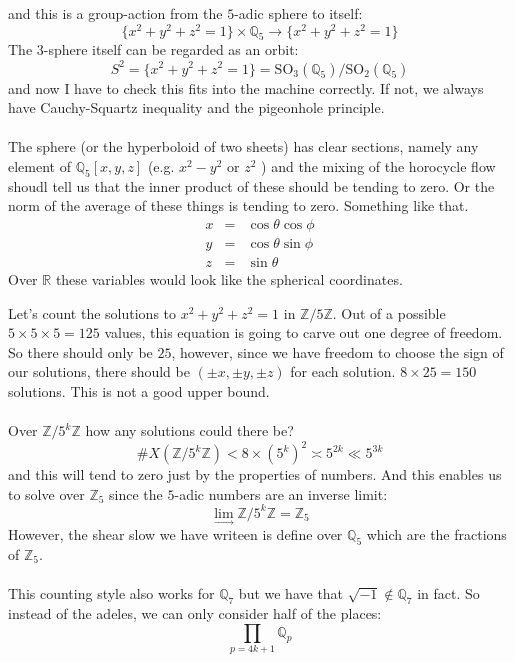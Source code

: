 \documentclass[12pt]{article}
\begin{document}
and this is a group-action from the $5$-adic sphere to itself:
$$\{ x^2 + y^2 + z^2 = 1 \} \times \mathbb{Q}_5 \to \{ x^2 + y^2 + z^2 = 1 \} $$
The 3-sphere itself can be regarded as an orbit:
$$ S^2 = \{ x^2 + y^2 + z^2 = 1 \} = \text{SO}_3(\mathbb{Q}_5) / \text{SO}_2(\mathbb{Q}_5) $$ 
and now I have to check this fits into the machine correctly.  If not, we always have Cauchy-Squartz inequality and the pigeonhole principle. \\ \\
The sphere (or the hyperboloid of two sheets) has clear sections, namely any element of $\mathbb{Q}_5[x,y,z]$ (e.g. $x^2 - y^2$ or $z^2$ ) and the mixing of the horocycle flow shoudl tell us that the inner product of these should be tending to zero.  Or the norm of the average of these things is tending to zero.  Something like that. 
\begin{eqnarray*}
x &=& \cos \theta \cos \phi \\
y &=& \cos \theta \sin \phi \\
z &=& \sin \theta
\end{eqnarray*}
Over $\mathbb{R}$ these variables would look like the spherical coordinates.
\vfill
\begin{thebibliography}{}


 
\end{thebibliography}
\newpage

\noindent Let's count the solutions to $x^2 + y^2 + z^2 = 1$ in $\mathbb{Z}/5\mathbb{Z}$.  Out of a possible $5 \times 5 \times 5 = 125$ values, this equation is going to carve out one degree of freedom.  So there should only be $25$, however, since we have freedom to choose the sign of our solutions, there should be $(\pm x, \pm y, \pm z)$ for each solution.  $8 \times 25 = 150$ solutions.  This is not a good upper bound. \\ \\
Over $\mathbb{Z}/5^k \mathbb{Z}$ how any solutions could there be?
$$ \# X(\mathbb{Z}/5^k \mathbb{Z})  < 8 \times (5^k)^2  \asymp 5^{2k} \ll 5^{3k}$$
and this will tend to zero just by the properties of numbers.  And this enables us to solve over $\mathbb{Z}_5$ since the $5$-adic numbers are an inverse limit:
$$ \lim_{\longrightarrow} \mathbb{Z}/5^k \mathbb{Z} = \mathbb{Z}_5 $$ 
However, the shear slow we have writeen is define over $\mathbb{Q}_5$ which are the fractions of $\mathbb{Z}_5$. \\ \\
This counting style also works for $\mathbb{Q}_7$ but we have that $\sqrt{-1} \notin \mathbb{Q}_7$ in fact.  So instead of the adeles, we can only consider half of the places: $$\prod_{p=4k+1} \mathbb{Q}_p$$
\end{document}
